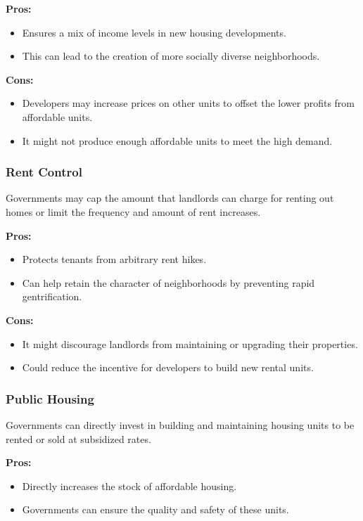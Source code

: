 \textbf{Pros:}
\begin{itemize}
    \item Ensures a mix of income levels in new housing developments.
    \item This can lead to the creation of more socially diverse neighborhoods.
\end{itemize}

\textbf{Cons:}
\begin{itemize}
    \item Developers may increase prices on other units to offset the lower profits from affordable units.
    \item It might not produce enough affordable units to meet the high demand.
\end{itemize}

\subsubsection*{Rent Control}
Governments may cap the amount that landlords can charge for renting out homes or limit the frequency and amount of rent increases.

\textbf{Pros:}
\begin{itemize}
    \item Protects tenants from arbitrary rent hikes.
    \item Can help retain the character of neighborhoods by preventing rapid gentrification.
\end{itemize}

\textbf{Cons:}
\begin{itemize}
    \item It might discourage landlords from maintaining or upgrading their properties.
    \item Could reduce the incentive for developers to build new rental units.
\end{itemize}

\subsubsection*{Public Housing}
Governments can directly invest in building and maintaining housing units to be rented or sold at subsidized rates.

\textbf{Pros:}
\begin{itemize}
    \item Directly increases the stock of affordable housing.
    \item Governments can ensure the quality and safety of these units.
\end{itemize}

